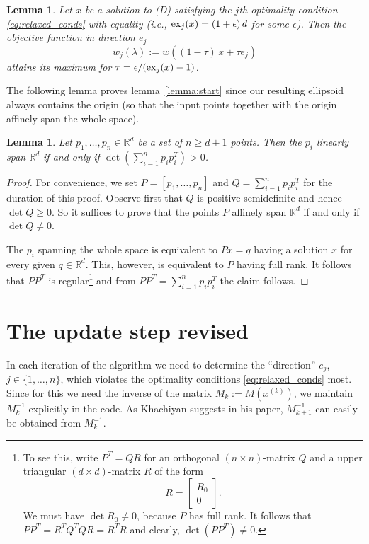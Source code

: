 \documentclass[a4paper,twocolumn]{article}
\newcommand{\R}{\ensuremath{\mathbb{R}}}
\newcommand{\excess}{\ensuremath{\mathop{\rm ex}\nolimits}}
\newtheorem{lemma}[theorem]{Lemma}
\begin{document}
\begin{lemma}
  Let $x$ be a solution to (D) satisfying the $j$th optimality
  condition \eqref{eq:relaxed_conds} with equality (i.e.,
  $\excess_j(x)=(1+\epsilon)\,d$ for some $\epsilon$).  Then
  the objective function in direction $e_j$
  \begin{equation}
    \label{eq:lin_search}
    w_j(\lambda):= w((1-\tau)\,x + \tau e_j)
  \end{equation}
  attains its maximum for $\tau = \epsilon / (\excess_j(x) - 1)$.
\end{lemma}

The following lemma proves lemma~\ref{lemma:start} since our resulting
ellipsoid always contains the origin (so that the input points
together with the origin affinely span the whole space).
%
\begin{lemma}
   Let $p_1,\ldots,p_n\in\R^d$ be a set of $n\ge d+1$ points.  Then
   the $p_i$ linearly span $\R^d$ if and only if $\det(\sum_{i=1}^n
   p_i p_i^T)>0$.
\end{lemma}
%
\begin{proof}
  For convenience, we set $P = [p_1,\ldots,p_n]$ and $Q=\sum_{i=1}^n
  p_i p_i^T$ for the duration of this proof.  Observe first that $Q$
  is positive semidefinite and hence $\det Q \ge 0$.  So it suffices
  to prove that the points $P$ affinely span $\R^d$ if and only if
  $\det Q \not=0$.
  
  The $p_i$ spanning the whole space is equivalent to $Px=q$ having a
  solution $x$ for every given $q\in\R^d$.  This, however, is
  equivalent to $P$ having full rank.  It follows that $PP^T$ is
  regular\footnote{To see this, write $P^T = QR$ for an orthogonal
  $(n\times n)$-matrix $Q$ and a upper triangular $(d\times d)$-matrix
  $R$ of the form
  \[ R = \left[
  \begin{array}{c}
  R_0 \\ 0
  \end{array}
  \right].
  \]
  We must have $\det R_0\not=0$, because $P$ has full rank.  It
  follows that $PP^T = R^TQ^T Q R = R^T R$ and clearly,
  $\det(PP^T)\not=0$.} and from $PP^T = \sum_{i=1}^n p_i p_i^T$ the
  claim follows.
\end{proof}

\section{The update step revised}
In each iteration of the algorithm we need to determine the
``direction'' $e_j$, $j\in\{1,\ldots,n\}$, which violates the
optimality conditions \eqref{eq:relaxed_conds} most.  Since for this
we need the inverse of the matrix $M_k:= M(x^{(k)})$, we maintain
$M_k^{-1}$ explicitly in the code.  As Khachiyan suggests in his
paper, $M_{k+1}^{-1}$ can easily be obtained from $M_k^{-1}$.
\end{document}
